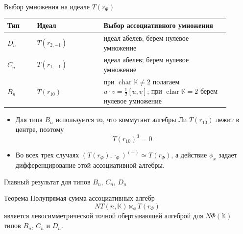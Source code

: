 \documentclass[12pt,aspectratio=169]{beamer}
\DeclareMathOperator{\Char}{char}
\newcommand{\K}{\mathbb{K}}
\begin{document}
\begin{frame}[t]{Выбор умножения на идеале $T(r_\Phi)$}
    \small
    \begin{center}
        \begin{tabular}{>{\raggedright\arraybackslash}p{0.12\linewidth} >{\raggedright\arraybackslash}p{0.27\linewidth} >{\raggedright\arraybackslash}p{0.51\linewidth}}
            \toprule
            Тип   & Идеал         & Выбор ассоциативного умножения                         \\
            \midrule
            $D_n$ & $T(r_{2,-1})$ & идеал абелев; берем нулевое умножение                  \\
            $C_n$ & $T(r_{1,-1})$ & идеал абелев; берем нулевое умножение                  \\
            $B_n$ & $T(r_{10})$   & при $\Char\K\neq 2$ полагаем
            $\displaystyle u\cdot v=\frac12[u,v]$; при $\Char\K=2$ берем нулевое умножение \\
            \bottomrule
        \end{tabular}
    \end{center}

    \begin{itemize}
        \item Для типа $B_n$ используется то, что коммутант алгебры Ли $T(r_{10})$ лежит в
              центре, поэтому
              \[
                  T(r_{10})^3=0.
              \]
        \item Во всех трех случаях $(T(r_\Phi),\cdot_\Phi)^{(-)}\simeq T(r_\Phi)$, а действие
              $\phi_x$ задает дифференцирование этой ассоциативной алгебры.
    \end{itemize}
\end{frame}

\begin{frame}[t]{Главный результат для типов $B_n$, $C_n$, $D_n$}
    \begin{alertblock}{Теорема}
        Полупрямая сумма ассоциативных алгебр
        \[
            NT(n,\K)\ltimes_\phi T(r_\Phi)
        \]
        является левосимметрической точной обертывающей алгеброй для $N\Phi(\K)$ типов
        $B_n$, $C_n$ и $D_n$.
    \end{alertblock}
\end{frame}
\end{document}
